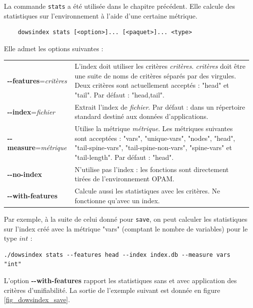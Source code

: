 \documentclass[a4paper]{report}
\theoremstyle{definition}
\begin{document}
La commande \texttt{stats} a été utilisée dans le chapitre précédent. Elle calcule des statistiques sur l'environnement à l'aide d'une certaine métrique.

\begin{center}
	\begin{verbatim}
	dowsindex stats [<option>]... [<paquet>]... <type>
	\end{verbatim}
\end{center}

Elle admet les options suivantes :

\begin{table}[h]
	\begin{tabularx}{\textwidth}{lX}
			\textbf{-{}-features}=\textit{critères} &
			L'index doit utiliser les critères \textit{critères}. \textit{critères} doit être une suite de noms de critères séparés par des virgules. Deux critères sont actuellement acceptés : "head" et "tail". Par défaut : "head,tail".
		\\
			\textbf{-{}-index}=\textit{fichier} &
			Extrait l'index de \textit{fichier}. Par défaut : dans un répertoire standard destiné aux données d'applications.
		\\
			\textbf{-{}-measure}=\textit{métrique} &
			Utilise la métrique \textit{métrique}. Les métriques suivantes sont acceptées : "vars", "unique-vars", "nodes", "head", "tail-spine-vars", "tail-spine-non-vars", "spine-vars" et "tail-length". Par défaut : "head".
		\\
			\textbf{-{}-no-index} &
			N'utilise pas l'index : les fonctions sont directement tirées de l'environnement OPAM.
		\\
			\textbf{-{}-with-features} &
			Calcule aussi les statistiques avec les critères. Ne fonctionne qu'avec un index.
	\end{tabularx}
\end{table}

Par exemple, à la suite de celui donné pour \texttt{save}, on peut calculer les statistiques sur l'index créé avec la métrique "vars" (comptant le nombre de variables) pour le type $int$ :

\begin{verbatim}
./dowsindex stats --features head --index index.db --measure vars "int"
\end{verbatim}

L'option \textbf{-{}-with-features} rapport les statistiques sans et avec application des critères d'unifiabilité. La sortie de l'exemple suivant est donnée en figure \ref{fig_dowsindex_save}.
\end{document}
